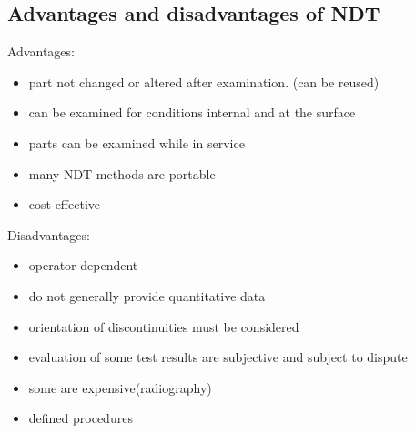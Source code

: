 \documentclass[11pt]{article}
\begin{document}
\subsection{Advantages and disadvantages of NDT}

Advantages:
\begin{itemize}
    \item part not changed or altered after examination. (can be reused)
    \item can be examined for conditions internal and at the surface
    \item parts can be examined while in service
    \item many NDT methods are portable 
    \item cost effective
\end{itemize}

Disadvantages:
\begin{itemize}
    \item operator dependent
    \item do not generally provide quantitative data
    \item orientation of discontinuities must be considered
    \item evaluation of some test results are subjective and subject to dispute
    \item some are expensive(radiography)
    \item defined procedures
\end{itemize}
\end{document}
